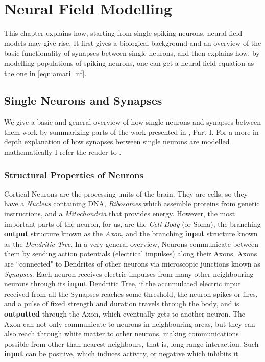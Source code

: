 \documentclass{uonmathreport}
\begin{document}
\section{Neural Field Modelling}\label{sec:nf modelling}
This chapter explains how, starting from single spiking neurons, neural field models may give rise. It first gives a biological background and an overview of the basic functionality of synapses between single neurons, and then explains how, by modelling populations of spiking neurons, one can get a neural field equation as the one in \ref{eqn:amari_nf}.
\subsection{Single Neurons and Synapses}\label{subsec:single_neurons}
We give a basic and general overview of how single neurons and synapses between them work by summarizing parts of the work presented in \cite{CompNeuroSci}, Part I. For a more in depth explanation of how synapses between single neurons are modelled mathematically I refer the reader to \cite{CompNeuroSci,bressloff2011spatiotemporal,bressloff2014waves}.
\subsubsection{Structural Properties of Neurons}\label{subsubsec:neurons_properties}
Cortical Neurons are the processing units of the brain. They are cells, so they have a \textit{Nucleus} containing DNA, \textit{Ribosomes} which assemble proteins from genetic instructions, and a \textit{Mitochondria} that provides energy. However, the most important parts of the neuron, for us, are the \textit{Cell Body} (or Soma), the branching \textbf{output} structure known as the \textit{Axon}, and the branching \textbf{input} structure known as the \textit{Dendritic Tree}. In a very general overview, Neurons communicate between them by sending action potentials (electrical impulses) along their Axons. Axons are ``connected" to Dendrites of other neurons via microscopic junctions known as \textit{Synapses}. Each neuron receives electric impulses from many other neighbouring neurons through its \textbf{input} Dendritic Tree, if the accumulated electric input received from all the Synapses reaches some threshold, the neuron spikes or fires, and a pulse of fixed strength and duration travels through the body, and is \textbf{outputted} through the Axon, which eventually gets to another neuron.
The Axon can not only communicate to neurons in neighbouring areas, but they can also reach through white matter to other neurons, making communications possible from other than nearest neighbours, that is, long range interaction. Such \textbf{input} can be positive, which induces activity, or negative which inhibits it.
\end{document}
